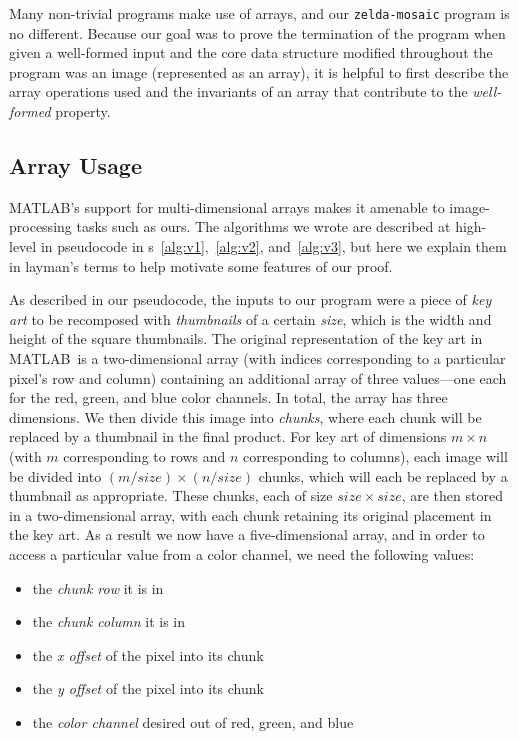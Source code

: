 \documentclass[11pt,conference]{IEEEtran}
\newcommand{\matlab}{MATLAB}
\newcommand{\var}[1]{\mathit{#1}}
\theoremstyle{plain} %
\theoremstyle{definition}
\theoremstyle{remark}
\begin{document}
Many non-trivial programs make use of arrays, and our \texttt{zelda-mosaic}
program is no different. Because our goal was to prove the termination of the
program when given a well-formed input and the core data structure modified
throughout the program was an image (represented as an array), it is helpful to
first describe the array operations used and the invariants of an array that
contribute to the \emph{well-formed} property.

\subsection{Array Usage}

\matlab's support for multi-dimensional arrays makes it amenable to
image-processing tasks such as ours. The algorithms we wrote are described at
high-level in pseudocode in \figurename{s}~\ref{alg:v1},~\ref{alg:v2},
and~\ref{alg:v3}, but here we explain them in layman's terms to help motivate
some features of our proof.

As described in our pseudocode, the inputs to our program were a piece of
\emph{key art} to be recomposed with \emph{thumbnails} of a certain \emph{size},
which is the width and height of the square thumbnails. The original
representation of the key art in \matlab\ is a two-dimensional array (with
indices corresponding to a particular pixel's row and column) containing an
additional array of three values---one each for the red, green, and blue color
channels. In total, the array has three dimensions. We then divide this image
into \emph{chunks}, where each chunk will be replaced by a
thumbnail in the final product. For key art of dimensions $m
\times n$ (with $m$ corresponding to rows and $n$ corresponding to columns), each
image will be divided into $(m / \var{size}) \times (n / \var{size})$ chunks, which
will each be replaced by a thumbnail as appropriate. These chunks,
each of size $\var{size} \times \var{size}$, are then stored in a two-dimensional array,
with each chunk retaining its original placement in the key art.
As a result we now have a five-dimensional array, and in order to access a
particular value from a color channel, we need the following values:

\begin{itemize}
\item the \emph{chunk row} it is in
\item the \emph{chunk column} it is in
\item the \emph{x offset} of the pixel into its chunk
\item the \emph{y offset} of the pixel into its chunk
\item the \emph{color channel} desired out of red, green, and blue
\end{itemize}
\end{document}
